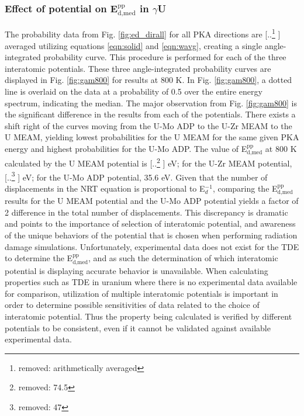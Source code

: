 \documentclass[review]{elsarticle}
\providecommand{\DIFaddtex}[1]{{\protect\color{blue} \sf #1}} %
\providecommand{\DIFdeltex}[1]{{\protect\color{red} [..\footnote{removed: #1} ]}} %
\providecommand{\DIFaddbegin}{} %
\providecommand{\DIFaddend}{} %
\providecommand{\DIFdelbegin}{} %
\providecommand{\DIFdelend}{} %
\providecommand{\DIFadd}[1]{\texorpdfstring{\DIFaddtex{#1}}{#1}} %
\providecommand{\DIFdel}[1]{\texorpdfstring{\DIFdeltex{#1}}{}} %
\newcommand{\DIFscaledelfig}{0.5}
\newlength{\DIFdelgraphicswidth} %
\newlength{\DIFdelgraphicsheight} %
\newcommand{\DIFaddincludegraphics}[2][]{{\color{blue}\fbox{\DIFOincludegraphics[#1]{#2}}}} %
\newcommand{\DIFdelincludegraphics}[2][]{%
\sbox{\DIFdelgraphicsbox}{\DIFOincludegraphics[#1]{#2}}%
\settoboxwidth{\DIFdelgraphicswidth}{\DIFdelgraphicsbox} %
\settoboxtotalheight{\DIFdelgraphicsheight}{\DIFdelgraphicsbox} %
\scalebox{\DIFscaledelfig}{%
\parbox[b]{\DIFdelgraphicswidth}{\usebox{\DIFdelgraphicsbox}\\[-\baselineskip] \rule{\DIFdelgraphicswidth}{0em}}\llap{\resizebox{\DIFdelgraphicswidth}{\DIFdelgraphicsheight}{%
\setlength{\unitlength}{\DIFdelgraphicswidth}%
\begin{picture}(1,1)%
\thicklines\linethickness{2pt} %
{\color[rgb]{1,0,0}\put(0,0){\framebox(1,1){}}}%
{\color[rgb]{1,0,0}\put(0,0){\line( 1,1){1}}}%
{\color[rgb]{1,0,0}\put(0,1){\line(1,-1){1}}}%
\end{picture}%
}\hspace*{3pt}}} %
} %
\DeclareRobustCommand{\DIFaddbegin}{\DIFOaddbegin \let\includegraphics\DIFaddincludegraphics} %
\DeclareRobustCommand{\DIFaddend}{\DIFOaddend \let\includegraphics\DIFOincludegraphics} %
\DeclareRobustCommand{\DIFdelbegin}{\DIFOdelbegin \let\includegraphics\DIFdelincludegraphics} %
\DeclareRobustCommand{\DIFdelend}{\DIFOaddend \let\includegraphics\DIFOincludegraphics} %
\begin{document}
\FloatBarrier

\subsubsection{Effect of potential on E$^{\textrm{pp}}_{\textrm{d,med}}$ in $\gamma$U}

The probability data from Fig. \ref{fig:ed_dirall} for all PKA directions are \DIFdelbegin \DIFdel{arithmetically averaged }\DIFdelend \DIFaddbegin \DIFadd{averaged utilizing equations \ref{eqn:solid} and \ref{eqn:wavg}}\DIFaddend , creating a single angle-integrated probability curve. This procedure is performed for each of the three interatomic potentials. These three angle-integrated probability curves are displayed in Fig. \ref{fig:gam800} for results at 800 K. In Fig. \ref{fig:gam800}, a dotted line is overlaid on the data at a probability of 0.5 over the entire energy spectrum, indicating the median. The major observation from Fig. \ref{fig:gam800} is the significant difference in the results from each of the potentials. There exists a shift right of the curves moving from the U-Mo ADP to the U-Zr MEAM to the U MEAM, yielding lowest probabilities for the U MEAM for the same given PKA energy and highest probabilities for the U-Mo ADP. The value of E$^{\textrm{pp}}_{\textrm{d,med}}$ at 800 K calculated by the U MEAM potential is \DIFdelbegin \DIFdel{74.5 }\DIFdelend \DIFaddbegin \DIFadd{73.2 }\DIFaddend eV; for the U-Zr MEAM potential, \DIFdelbegin \DIFdel{47 }\DIFdelend \DIFaddbegin \DIFadd{47.1 }\DIFaddend eV; for the U-Mo ADP potential, 35.6 eV. Given that the number of displacements in the NRT equation \cite{norgett1975} is proportional to E$_{d}^{-1}$, comparing the E$^{\textrm{pp}}_{\textrm{d,med}}$ results for the U MEAM potential and the U-Mo ADP potential yields a factor of 2 difference in the total number of displacements. This discrepancy is dramatic and points to the importance of selection of interatomic potential, and awareness of the unique behaviors of the potential that is chosen when performing radiation damage simulations. Unfortunately, experimental data does not exist for the TDE to determine the E$^{\textrm{pp}}_{\textrm{d,med}}$, and as such the determination of which interatomic potential is displaying accurate behavior is unavailable. When calculating properties such as TDE in uranium where there is no experimental data available for comparison, utilization of multiple interatomic potentials is important in order to determine possible sensitivities of data related to the choice of interatomic potential. Thus the property being calculated is verified by different potentials to be consistent, even if it cannot be validated against available experimental data.
\end{document}
